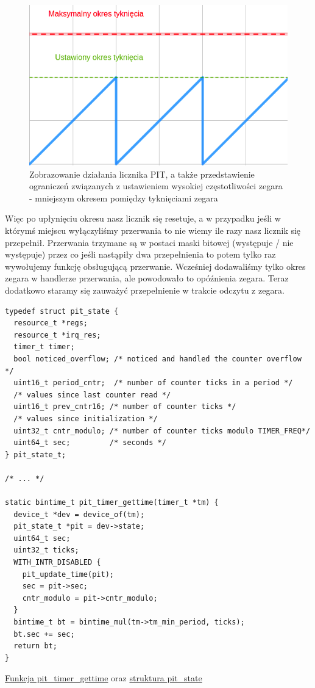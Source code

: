 \documentclass[shortabstract]{iithesis}
\theoremstyle{definition} \newtheorem*{definition}{Definicja}
\theoremstyle{definition} \newtheorem*{example}{Przykład}
\theoremstyle{definition} \newtheorem*{remark}{Uwaga}
\newenvironment{longlisting}{\captionsetup{type=listing}}{}
\begin{document}
\begin{figure}[ht]
\centering
\includegraphics[scale=0.5]{images/pitcounter.png}
\caption{Zobrazowanie działania licznika PIT, a także przedstawienie ograniczeń związanych z ustawieniem wysokiej częstotliwości zegara - mniejszym okresem pomiędzy tyknięciami zegara}
\end{figure} 

Więc po upłynięciu okresu nasz licznik się resetuje, a w przypadku jeśli w którymś miejscu wyłączyliśmy przerwania to nie wiemy ile razy nasz licznik się przepełnił. Przerwania trzymane są w postaci maski bitowej (występuje / nie występuje) przez co jeśli nastąpiły dwa przepełnienia to potem tylko raz wywołujemy funkcję obsługującą przerwanie. Wcześniej dodawaliśmy tylko okres zegara w handlerze przerwania, ale powodowało to opóźnienia zegara. Teraz dodatkowo staramy się zauważyć przepełnienie w trakcie odczytu z zegara.

\begin{longlisting}
  \begin{verbatim}
typedef struct pit_state {
  resource_t *regs;
  resource_t *irq_res;
  timer_t timer;
  bool noticed_overflow; /* noticed and handled the counter overflow */
  uint16_t period_cntr;  /* number of counter ticks in a period */
  /* values since last counter read */
  uint16_t prev_cntr16; /* number of counter ticks */
  /* values since initialization */
  uint32_t cntr_modulo; /* number of counter ticks modulo TIMER_FREQ*/
  uint64_t sec;         /* seconds */
} pit_state_t;

/* ... */
  
static bintime_t pit_timer_gettime(timer_t *tm) {
  device_t *dev = device_of(tm);
  pit_state_t *pit = dev->state;
  uint64_t sec;
  uint32_t ticks;
  WITH_INTR_DISABLED {
    pit_update_time(pit);
    sec = pit->sec;
    cntr_modulo = pit->cntr_modulo;
  }
  bintime_t bt = bintime_mul(tm->tm_min_period, ticks);
  bt.sec += sec;
  return bt;
}
  \end{verbatim}
  \caption{\href{https://mimiker.ii.uni.wroc.pl/source/xref/mimiker/sys/drv/pit.c?r=2609772a&mo=220&fi=9\#125}{Funkcja pit\_timer\_gettime} oraz \href{https://mimiker.ii.uni.wroc.pl/source/xref/mimiker/sys/drv/pit.c?r=2609772a&mo=220&fi=9\#9}{struktura pit\_state}}
  \label{lst:functimerpitgettime}
\end{longlisting}
\end{document}

